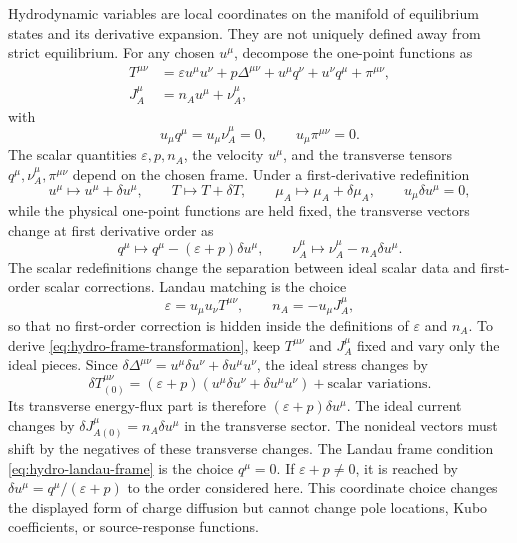 Hydrodynamic variables are local coordinates on the manifold of equilibrium
states and its derivative expansion.  They are not uniquely defined away
from strict equilibrium.  For any chosen \(u^\mu\), decompose the one-point
functions as
\begin{align}
  T^{\mu\nu}
  &=
  \varepsilon u^\mu u^\nu
  +p\Delta^{\mu\nu}
  +u^\mu q^\nu+u^\nu q^\mu
  +\pi^{\mu\nu},
  \label{eq:hydro-general-frame-stress}\\
  J_A^\mu&=n_Au^\mu+\nu_A^\mu ,
  \label{eq:hydro-general-frame-current}
\end{align}
with
\[
  u_\mu q^\mu=u_\mu\nu_A^\mu=0,
  \qquad
  u_\mu\pi^{\mu\nu}=0 .
\]
The scalar quantities \(\varepsilon,p,n_A\), the velocity \(u^\mu\), and the
transverse tensors \(q^\mu,\nu_A^\mu,\pi^{\mu\nu}\) depend on the chosen
frame.  Under a first-derivative redefinition
\[
  u^\mu\mapsto u^\mu+\delta u^\mu,\qquad
  T\mapsto T+\delta T,\qquad
  \mu_A\mapsto\mu_A+\delta\mu_A,\qquad
  u_\mu\delta u^\mu=0,
\]
while the physical one-point functions are held fixed, the transverse
vectors change at first derivative order as
\begin{equation}
  q^\mu\mapsto q^\mu-(\varepsilon+p)\delta u^\mu,
  \qquad
  \nu_A^\mu\mapsto\nu_A^\mu-n_A\delta u^\mu .
  \label{eq:hydro-frame-transformation}
\end{equation}
The scalar redefinitions change the separation between ideal scalar data and
first-order scalar corrections.  Landau matching is the choice
\[
  \varepsilon=u_\mu u_\nu T^{\mu\nu},
  \qquad
  n_A=-u_\mu J_A^\mu ,
\]
so that no first-order correction is hidden inside the definitions of
\(\varepsilon\) and \(n_A\).  To derive
\eqref{eq:hydro-frame-transformation}, keep \(T^{\mu\nu}\) and \(J_A^\mu\)
fixed and vary only the ideal pieces.  Since
\(\delta\Delta^{\mu\nu}=u^\mu\delta u^\nu+\delta u^\mu u^\nu\), the ideal
stress changes by
\[
  \delta T^{\mu\nu}_{(0)}
  =
  (\varepsilon+p)(u^\mu\delta u^\nu+\delta u^\mu u^\nu)
  +\text{scalar variations}.
\]
Its transverse energy-flux part is therefore
\((\varepsilon+p)\delta u^\mu\).  The ideal current changes by
\(\delta J^\mu_{A(0)}=n_A\delta u^\mu\) in the transverse sector.  The
nonideal vectors must shift by the negatives of these transverse changes.
The Landau frame condition \eqref{eq:hydro-landau-frame} is the choice
\(q^\mu=0\).  If \(\varepsilon+p\ne0\), it is reached by
\(\delta u^\mu=q^\mu/(\varepsilon+p)\) to the order considered here.  This
coordinate choice changes the displayed form of charge diffusion but cannot
change pole locations, Kubo coefficients, or source-response functions.

